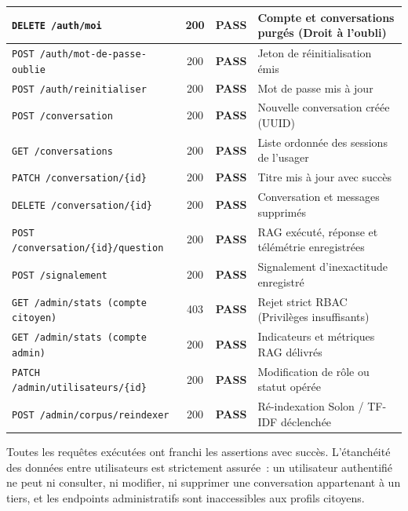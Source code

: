 \begin{table}[H]
\begin{tabular}{|p{5.0cm}|c|c|p{4.6cm}|}
\hline
\texttt{DELETE /auth/moi} & 200 & \textcolor{green!60!black}{\textbf{PASS}} & Compte et conversations purgés (Droit à l'oubli) \\
\hline
\texttt{POST /auth/mot-de-passe-oublie} & 200 & \textcolor{green!60!black}{\textbf{PASS}} & Jeton de réinitialisation émis \\
\hline
\texttt{POST /auth/reinitialiser} & 200 & \textcolor{green!60!black}{\textbf{PASS}} & Mot de passe mis à jour \\
\hline
\texttt{POST /conversation} & 200 & \textcolor{green!60!black}{\textbf{PASS}} & Nouvelle conversation créée (UUID) \\
\hline
\texttt{GET /conversations} & 200 & \textcolor{green!60!black}{\textbf{PASS}} & Liste ordonnée des sessions de l'usager \\
\hline
\texttt{PATCH /conversation/\{id\}} & 200 & \textcolor{green!60!black}{\textbf{PASS}} & Titre mis à jour avec succès \\
\hline
\texttt{DELETE /conversation/\{id\}} & 200 & \textcolor{green!60!black}{\textbf{PASS}} & Conversation et messages supprimés \\
\hline
\texttt{POST /conversation/\{id\}/question} & 200 & \textcolor{green!60!black}{\textbf{PASS}} & RAG exécuté, réponse et télémétrie enregistrées \\
\hline
\texttt{POST /signalement} & 200 & \textcolor{green!60!black}{\textbf{PASS}} & Signalement d'inexactitude enregistré \\
\hline
\texttt{GET /admin/stats (compte citoyen)} & 403 & \textcolor{green!60!black}{\textbf{PASS}} & Rejet strict RBAC (Privilèges insuffisants) \\
\hline
\texttt{GET /admin/stats (compte admin)} & 200 & \textcolor{green!60!black}{\textbf{PASS}} & Indicateurs et métriques RAG délivrés \\
\hline
\texttt{PATCH /admin/utilisateurs/\{id\}} & 200 & \textcolor{green!60!black}{\textbf{PASS}} & Modification de rôle ou statut opérée \\
\hline
\texttt{POST /admin/corpus/reindexer} & 200 & \textcolor{green!60!black}{\textbf{PASS}} & Ré-indexation Solon / TF-IDF déclenchée \\
\hline
\end{tabular}
\end{table}

Toutes les requêtes exécutées ont franchi les assertions avec succès. L'étanchéité des données entre utilisateurs est strictement assurée~: un utilisateur authentifié ne peut ni consulter, ni modifier, ni supprimer une conversation appartenant à un tiers, et les endpoints administratifs sont inaccessibles aux profils citoyens.

